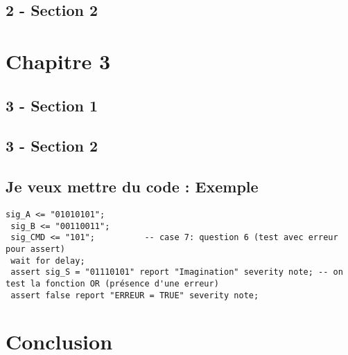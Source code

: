 \documentclass[11pt,a4paper]{report}
\begin{document}
\section{2 - Section 2}

\chapter{Chapitre 3}

\section{3 - Section 1}

\section{3 - Section 2}

\section{Je veux mettre du code : Exemple}

\begin{lstlisting}[label=un-label,caption=Titre du code : ex VHDL ]
 sig_A <= "01010101";
 sig_B <= "00110011";		 
 sig_CMD <= "101";			-- case 7: question 6 (test avec erreur pour assert)		   
 wait for delay;
 assert sig_S = "01110101" report "Imagination" severity note; -- on test la fonction OR (présence d'une erreur)
 assert false report "ERREUR = TRUE" severity note;
\end{lstlisting}


\chapter*{Conclusion}



%

\end{document}
